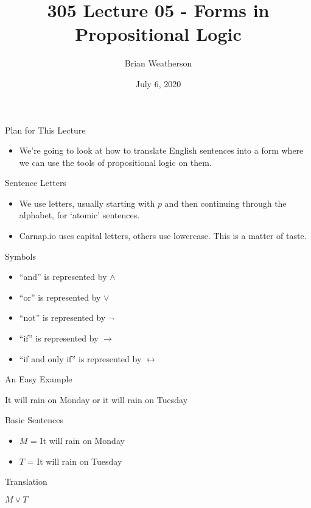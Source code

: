 \documentclass[
  ignorenonframetext,
]{beamer}
\title{305 Lecture 05 - Forms in Propositional Logic}
\author{Brian Weatherson}
\date{July 6, 2020}
\providecommand{\tightlist}{%
  \setlength{\itemsep}{0pt}\setlength{\parskip}{0pt}}
\renewcommand{\,}{\text{, }}
\renewenvironment*{quote}	
	{\list{}{\rightmargin   \leftmargin} \item } 	
	{\endlist }
\begin{document}
\frame{\titlepage}

\begin{frame}{Plan for This Lecture}
\protect\hypertarget{plan-for-this-lecture}{}

\begin{itemize}
\tightlist
\item
  We're going to look at how to translate English sentences into a form
  where we can use the tools of propositional logic on them.
\end{itemize}

\end{frame}

\begin{frame}{Sentence Letters}
\protect\hypertarget{sentence-letters}{}

\begin{itemize}
\tightlist
\item
  We use letters, usually starting with \(p\) and then continuing
  through the alphabet, for `atomic' sentences.
\item
  Carnap.io uses capital letters, others use lowercase. This is a matter
  of taste.
\end{itemize}

\end{frame}

\begin{frame}{Symbols}
\protect\hypertarget{symbols}{}

\begin{itemize}
\tightlist
\item
  ``and'' is represented by \(\wedge\)
\item
  ``or'' is represented by \(\vee\)
\item
  ``not'' is represented by \(\neg\)
\item
  ``if'' is represented by \(\rightarrow\)
\item
  ``if and only if'' is represented by \(\leftrightarrow\)
\end{itemize}

\end{frame}

\begin{frame}{An Easy Example}
\protect\hypertarget{an-easy-example}{}

\begin{quote}
It will rain on Monday or it will rain on Tuesday
\end{quote}

Basic Sentences

\begin{itemize}
\tightlist
\item
  \(M\) = It will rain on Monday
\item
  \(T\) = It will rain on Tuesday
\end{itemize}

Translation

\begin{quote}
\(M \vee T\)
\end{quote}

\end{frame}
\end{document}
